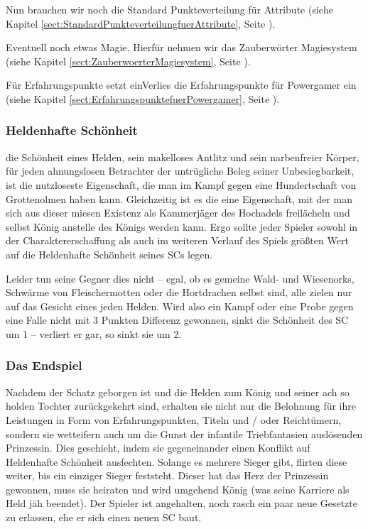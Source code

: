 Nun brauchen wir noch die Standard Punkteverteilung für Attribute (siehe Kapitel \ref {sect:StandardPunkteverteilungfuerAttribute}, Seite \pageref {sect:StandardPunkteverteilungfuerAttribute}).

Eventuell noch etwas Magie. Hierfür nehmen wir das Zauberwörter Magiesystem (siehe Kapitel \ref {sect:ZauberwoerterMagiesystem}, Seite \pageref {sect:ZauberwoerterMagiesystem}).

Für Erfahrungspunkte setzt einVerlies die Erfahrungspunkte für Powergamer ein (siehe Kapitel \ref {sect:ErfahrungspunktefuerPowergamer}, Seite \pageref {sect:ErfahrungspunktefuerPowergamer}).


 
\subsubsection{Heldenhafte Schönheit}

die Schönheit eines Helden, sein makelloses Antlitz und sein narbenfreier Körper, für jeden ahnungslosen Betrachter der untrügliche Beleg seiner Unbesiegbarkeit, ist die nutzloseste Eigenschaft, die man im Kampf gegen eine Hundertschaft von Grottenolmen haben kann. Gleichzeitig ist es die eine Eigenschaft, mit der man sich aus dieser miesen Existenz als Kammerjäger des Hochadels freilächeln und selbst König anstelle des Königs werden kann. Ergo sollte jeder Spieler sowohl in der Charaktererschaffung als auch im weiteren Verlauf des Spiels größten Wert auf die Heldenhafte Schönheit seines SCs legen.

Leider tun seine Gegner dies nicht -- egal, ob es gemeine Wald- und Wiesenorks, Schwärme von Fleischermotten oder die Hortdrachen selbst sind, alle zielen nur auf das Gesicht eines jeden Helden. Wird also ein Kampf oder eine Probe gegen eine Falle nicht mit 3 Punkten Differenz gewonnen, sinkt die Schönheit des SC um 1 -- verliert er gar, so sinkt sie um 2.

 
\subsubsection{Das Endspiel}

Nachdem der Schatz geborgen ist und die Helden zum König und seiner ach so holden Tochter zurückgekehrt sind, erhalten sie nicht nur die Belohnung für ihre Leistungen in Form von Erfahrungspunkten, Titeln und / oder Reichtümern, sondern sie wetteifern auch um die Gunst der infantile Triebfantasien auslösenden Prinzessin. Dies geschieht, indem sie gegeneinander einen Konflikt auf Heldenhafte Schönheit ausfechten. Solange es mehrere Sieger gibt, flirten diese weiter, bis ein einziger Sieger feststeht. Dieser hat das Herz der Prinzessin gewonnen, muss sie heiraten und wird umgehend König (was seine Karriere als Held jäh beendet). Der Spieler ist angehalten, noch rasch ein paar neue Gesetzte zu erlassen, ehe er sich einen neuen SC baut.


